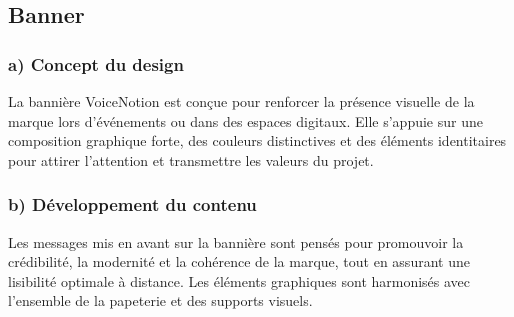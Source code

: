 \subsection{Banner}
\subsubsection*{a) Concept du design}
La bannière VoiceNotion est conçue pour renforcer la présence visuelle de la marque lors d’événements ou dans des espaces digitaux. Elle s’appuie sur une composition graphique forte, des couleurs distinctives et des éléments identitaires pour attirer l’attention et transmettre les valeurs du projet.

\subsubsection*{b) Développement du contenu}
Les messages mis en avant sur la bannière sont pensés pour promouvoir la crédibilité, la modernité et la cohérence de la marque, tout en assurant une lisibilité optimale à distance. Les éléments graphiques sont harmonisés avec l’ensemble de la papeterie et des supports visuels.

